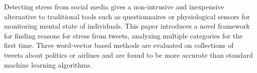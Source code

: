 Detecting stress from social media gives a non-intrusive and inexpensive alternative to traditional tools such as questionnaires or physiological sensors for monitoring mental state of individuals. This paper introduces a novel framework for finding reasons for stress from tweets, analyzing multiple categories for the first time. Three word-vector based methods are evaluated on collections of tweets about politics or airlines and are found to be more accurate than standard machine learning algorithms.
